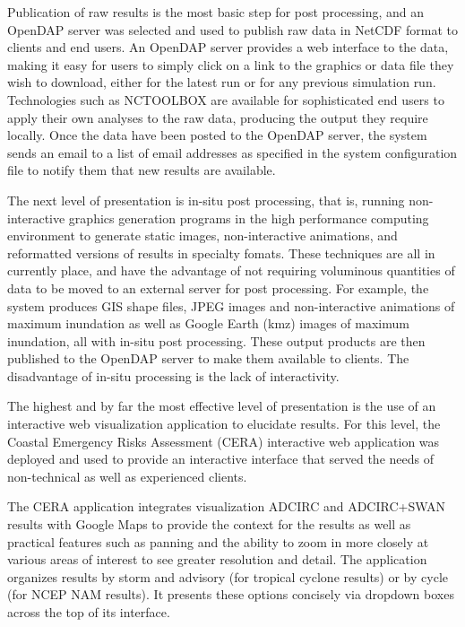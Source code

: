 \documentclass[12pt]{article}
\begin{document}
Publication of raw results is the most basic step for post 
processing, and an OpenDAP server was selected and used to publish 
raw data in NetCDF format to clients and end users. An OpenDAP 
server provides a web interface to the data, making it easy for 
users to simply click on a link to the graphics or data file they 
wish to download, either for the latest run or for any previous 
simulation run.  Technologies such as NCTOOLBOX are available for 
sophisticated end users to apply their own analyses to the raw data, 
producing the output they require locally.  Once the data have been 
posted to the OpenDAP server, the system sends an email to a list of 
email addresses as specified in the system configuration file to 
notify them that new results are available. 

The next level of presentation is in-situ post processing, that is, 
running non-interactive graphics generation programs in the high 
performance computing environment to generate static images, 
non-interactive animations, and reformatted versions of results in 
specialty fomats. These techniques are all in currently place, and 
have the advantage of not requiring voluminous quantities of data to 
be moved to an external server for post processing. For example, the 
system produces GIS shape files, JPEG images and non-interactive 
animations of maximum inundation as well as Google Earth (kmz) 
images of maximum inundation, all with in-situ post processing. 
These output products are then published to the OpenDAP server to 
make them available to clients. The disadvantage of in-situ 
processing is the lack of interactivity. 

The highest and by far the most effective level of presentation is 
the use of an interactive web visualization application to elucidate 
results. For this level, the Coastal Emergency Risks Assessment 
(CERA) interactive web application was deployed and used to provide 
an interactive interface that served the needs of non-technical as 
well as experienced clients. 

The CERA application integrates visualization ADCIRC and ADCIRC+SWAN 
results with Google Maps to provide the context for the results as 
well as practical features such as panning and the ability to zoom 
in more closely at various areas of interest to see greater 
resolution and detail. The application organizes results by storm 
and advisory (for tropical cyclone results) or by cycle (for NCEP 
NAM results). It presents these options concisely via dropdown boxes 
across the top of its interface.
\end{document}
